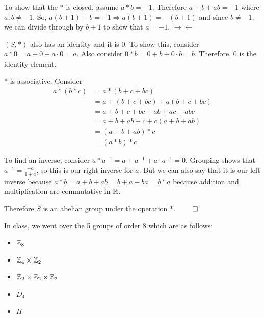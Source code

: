\documentclass{report}
\begin{document}
\sol 

To show that the $*$ is closed, assume $a*b = -1$. Therefore $a + b + ab = -1$ where $a,b \neq -1$. So, $a(b+1) + b = -1 \Rightarrow a(b+1) = -(b+1)$ and since $b \neq -1$, we can divide through by $b+1$ to show that $a = -1$. $\rightarrow \leftarrow$

$(S, *)$ also has an identity and it is $0$. To show this, consider $a*0 = a + 0 + a\cdot 0 = a$. Also consider $0 * b = 0 + b + 0\cdot b = b$. Therefore, $0$ is the identity element.

$*$ is associative. Consider 
\begin{equation} 
    \begin{split}
    a * (b * c) & = a  * (b + c + bc) \\
    & = a + (b + c + bc) + a(b + c + bc) \\
    & = a + b + c + bc + ab + ac + abc \\
    & = a + b + ab + c + c(a + b + ab) \\
    & = (a + b + ab) * c \\
    & = (a * b) * c
    \end{split}
\end{equation}

To find an inverse, consider $a * a^{-1} = a + a^{-1} + a\cdot a^{-1} = 0$. Grouping shows that $a^{-1} = \displaystyle\frac{-a}{1 + a}$, so this is our right inverse for $a$. But we can also say that it is our left inverse because $a * b = a + b + ab = b + a + ba = b*a$ because addition and multiplication are commutative in $\RR$.

Therefore $S$ is an abelian group under the operation $*$. $\qed$

\sol In class, we went over the 5 groups of order 8 which are as follows:

\begin{itemize}
    \item $\ZZ_8$
    \item $\ZZ_4 \times \ZZ_2$
    \item $\ZZ_2 \times \ZZ_2 \times \ZZ_2$
    \item $D_4$
    \item $H$
\end{itemize}
\end{document}
